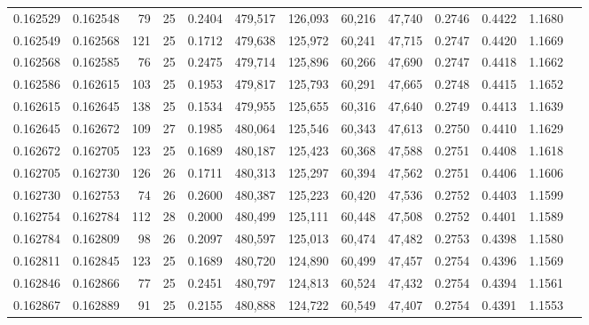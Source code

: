 \begin{tabular}{rrrrrrrrrrrrr}
0.162529 & 0.162548 &  79 &  25 &                                     0.2404 & 479,517 & 126,093 &  60,216 &  47,740 & 0.2746 & 0.4422 & 1.1680 \\
0.162549 & 0.162568 & 121 &  25 &                                     0.1712 & 479,638 & 125,972 &  60,241 &  47,715 & 0.2747 & 0.4420 & 1.1669 \\
0.162568 & 0.162585 &  76 &  25 &                                     0.2475 & 479,714 & 125,896 &  60,266 &  47,690 & 0.2747 & 0.4418 & 1.1662 \\
0.162586 & 0.162615 & 103 &  25 &                                     0.1953 & 479,817 & 125,793 &  60,291 &  47,665 & 0.2748 & 0.4415 & 1.1652 \\
0.162615 & 0.162645 & 138 &  25 &                                     0.1534 & 479,955 & 125,655 &  60,316 &  47,640 & 0.2749 & 0.4413 & 1.1639 \\
0.162645 & 0.162672 & 109 &  27 &                                     0.1985 & 480,064 & 125,546 &  60,343 &  47,613 & 0.2750 & 0.4410 & 1.1629 \\
0.162672 & 0.162705 & 123 &  25 &                                     0.1689 & 480,187 & 125,423 &  60,368 &  47,588 & 0.2751 & 0.4408 & 1.1618 \\
0.162705 & 0.162730 & 126 &  26 &                                     0.1711 & 480,313 & 125,297 &  60,394 &  47,562 & 0.2751 & 0.4406 & 1.1606 \\
0.162730 & 0.162753 &  74 &  26 &                                     0.2600 & 480,387 & 125,223 &  60,420 &  47,536 & 0.2752 & 0.4403 & 1.1599 \\
0.162754 & 0.162784 & 112 &  28 &                                     0.2000 & 480,499 & 125,111 &  60,448 &  47,508 & 0.2752 & 0.4401 & 1.1589 \\
0.162784 & 0.162809 &  98 &  26 &                                     0.2097 & 480,597 & 125,013 &  60,474 &  47,482 & 0.2753 & 0.4398 & 1.1580 \\
0.162811 & 0.162845 & 123 &  25 &                                     0.1689 & 480,720 & 124,890 &  60,499 &  47,457 & 0.2754 & 0.4396 & 1.1569 \\
0.162846 & 0.162866 &  77 &  25 &                                     0.2451 & 480,797 & 124,813 &  60,524 &  47,432 & 0.2754 & 0.4394 & 1.1561 \\
0.162867 & 0.162889 &  91 &  25 &                                     0.2155 & 480,888 & 124,722 &  60,549 &  47,407 & 0.2754 & 0.4391 & 1.1553 \\

\end{tabular}
